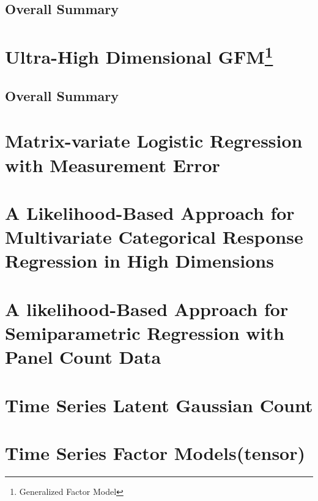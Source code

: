 \documentclass{article}[12pt]
\begin{document}
\subsection{Overall Summary}
\section [Ultra-High Dimensional GFM]{Ultra-High Dimensional GFM\footnote{Generalized Factor Model}} 
\subsection{Overall Summary} 

\section{Matrix-variate Logistic Regression with Measurement Error}
\section{A Likelihood-Based Approach for Multivariate Categorical Response Regression in High Dimensions}
\section{A likelihood-Based Approach for Semiparametric Regression with Panel Count Data}


\section{Time Series Latent Gaussian Count}
\section{Time Series Factor Models(tensor)}   
\end{document}
